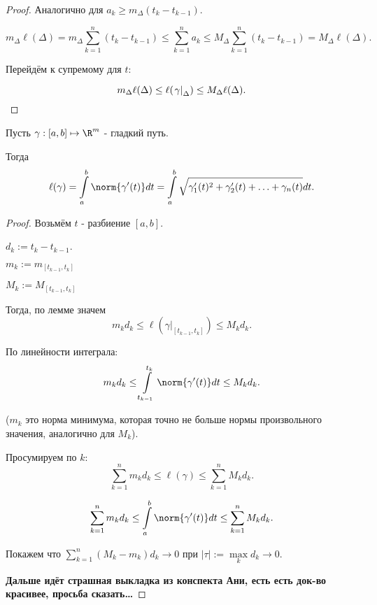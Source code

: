 \begin{lemma}
\begin{proof}
            Аналогично для $a_{k} \ge m_{\Delta}(t_{k}-t_{k-1})$.

            \[ m_{\Delta} \ell(\Delta) = m_{\Delta} \sum\limits_{k=1}^{n} (t_{k}-t_{k-1}) \le \sum\limits_{k=1}^{n} a_{k} \le M_{\Delta} \sum\limits_{k=1}^{n} (t_{k}-t_{k-1}) = M_{\Delta} \ell(\Delta) .\]

            Перейдём к супремому для $t$:

            \[ m_{\Delta} \ell(\Delta) \le \ell(\left.\gamma\right|_{\Delta}) \le M_{\Delta} \ell(\Delta) . \qedhere\] 
        \end{proof}
\end{lemma}

\begin{theorem} \thmslashn

    Пусть $\gamma : [a, b] \mapsto \R^{m}$ - гладкий путь.

    Тогда
    \[ \ell(\gamma) = \int\limits_{a}^{b} \norm{\gamma'(t)}dt = \int\limits_{a}^{b} \sqrt{\gamma_1'(t)^2 + \gamma_2'(t) + \ldots + \gamma_{n}(t)}dt    .\]
    \begin{proof} \thmslashn
    
        Возьмём $t$ - разбиение $[a, b]$.
        
        $d_{k} := t_{k} - t_{k-1}$.

        $m_{k} := m_{[t_{k-1}, t_{k}]}$

        $M_{k} := M_{[t_{k-1}, t_{k}]}$

        Тогда, по лемме значем
        \[ m_{k}d_{k} \le \ell\left( \left. \gamma\right|_{[t_{k-1}, t_{k}]} \right) \le M_{k}d_{k}  .\]

        По линейности интеграла:
        \[ m_{k}d_{k} \le \int\limits_{t_{k-1}}^{t_{k}} \norm{\gamma'(t)}dt  \le M_{k}d_{k}  .\]

        ($m_{k}$ это норма минимума, которая точно не больше нормы произвольного значения, аналогично для $M_{k}$).

        Просумируем по $k$:
        \[ \sum\limits_{k=1}^{n} m_{k}d_{k} \le \ell\left(\gamma\right) \le \sum\limits_{k=1}^{n} M_{k}d_{k}  .\]
        
        \[ \sum\limits_{k=1}^{n} m_{k}d_{k} \le \int\limits_{a}^{b} \norm{\gamma'(t)}dt  \le \sum\limits_{k=1}^{n} M_{k}d_{k}  .\]

        Покажем что $\sum\limits_{k=1}^{n} (M_{k} - m_{k})d_{k} \to 0$ при $|\tau| := \max\limits_{k} d_{k} \to 0$.

        \textbf{Дальше идёт страшная выкладка из конспекта Ани, есть есть док-во красивее, просьба сказать\ldots}



\end{proof}
\end{theorem}
